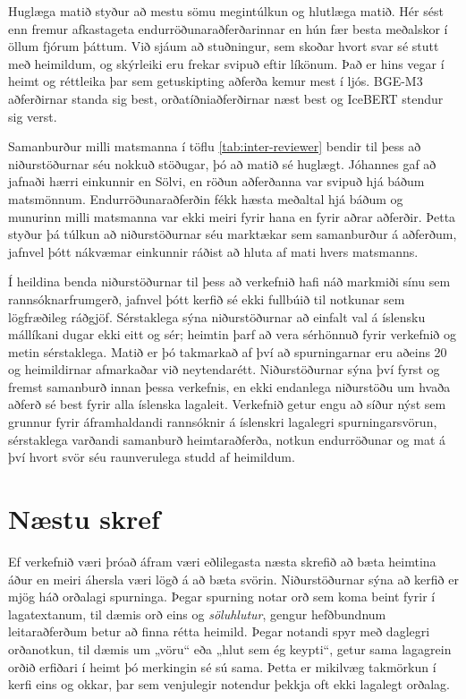 \documentclass[fleqn]{report}
\begin{document}
Huglæga matið styður að mestu sömu megintúlkun og hlutlæga matið. Hér sést enn fremur afkastageta endurröðunaraðferðarinnar en hún fær besta meðalskor í öllum fjórum þáttum. Við sjáum að stuðningur, sem skoðar hvort svar sé stutt með heimildum, og skýrleiki eru frekar svipuð eftir líkönum. Það er hins vegar í heimt og réttleika þar sem getuskipting aðferða kemur mest í ljós. BGE-M3 aðferðirnar standa sig best, orðatíðniaðferðirnar næst best og IceBERT stendur sig verst. 

Samanburður milli matsmanna í töflu \ref{tab:inter-reviewer} bendir til þess að niðurstöðurnar séu nokkuð stöðugar, þó að matið sé huglægt. Jóhannes gaf að jafnaði hærri einkunnir en Sölvi, en röðun aðferðanna var svipuð hjá báðum matsmönnum. Endurröðunaraðferðin fékk hæsta meðaltal hjá báðum og munurinn milli matsmanna var ekki meiri fyrir hana en fyrir aðrar aðferðir. Þetta styður þá túlkun að niðurstöðurnar séu marktækar sem samanburður á aðferðum, jafnvel þótt nákvæmar einkunnir ráðist að hluta af mati hvers matsmanns.

Í heildina benda niðurstöðurnar til þess að verkefnið hafi náð markmiði sínu sem rannsóknarfrumgerð, jafnvel þótt kerfið sé ekki fullbúið til notkunar sem lögfræðileg ráðgjöf. Sérstaklega sýna niðurstöðurnar að einfalt val á íslensku mállíkani dugar ekki eitt og sér; heimtin þarf að vera sérhönnuð fyrir verkefnið og metin sérstaklega. Matið er þó takmarkað af því að spurningarnar eru aðeins 20 og heimildirnar afmarkaðar við neytendarétt. Niðurstöðurnar sýna því fyrst og fremst samanburð innan þessa verkefnis, en ekki endanlega niðurstöðu um hvaða aðferð sé best fyrir alla íslenska lagaleit. Verkefnið getur engu að síður nýst sem grunnur fyrir áframhaldandi rannsóknir á íslenskri lagalegri spurningarsvörun, sérstaklega varðandi samanburð heimtaraðferða, notkun endurröðunar og mat á því hvort svör séu raunverulega studd af heimildum.


\section{Næstu skref}

Ef verkefnið væri þróað áfram væri eðlilegasta næsta skrefið að bæta heimtina áður en meiri áhersla væri lögð á að bæta svörin. Niðurstöðurnar sýna að kerfið er mjög háð orðalagi spurninga. Þegar spurning notar orð sem koma beint fyrir í lagatextanum, til dæmis orð eins og \textit{söluhlutur}, gengur hefðbundnum leitaraðferðum betur að finna rétta heimild. Þegar notandi spyr með daglegri orðanotkun, til dæmis um „vöru“ eða „hlut sem ég keypti“, getur sama lagagrein orðið erfiðari í heimt þó merkingin sé sú sama. Þetta er mikilvæg takmörkun í kerfi eins og okkar, þar sem venjulegir notendur þekkja oft ekki lagalegt orðalag.
\end{document}
